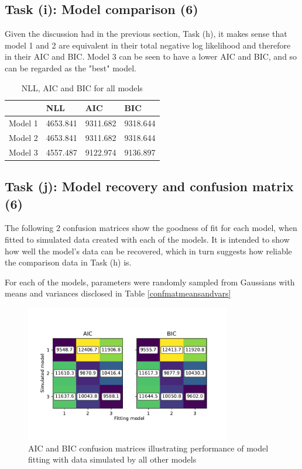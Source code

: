 \documentclass{article}
\begin{document}
\subsection{Task (i): Model comparison (6)}

Given the discussion had in the previous section, Task (h), it makes sense that model 1 and 2 are equivalent in their total negative log likelihood and therefore in their AIC and BIC. Model 3 can be seen to have a lower AIC and BIC, and so can be regarded as the "best" model.
\begin{table}[H]
  \centering
  \begin{tabular}{@{}llll@{}}
  \toprule
          & NLL      & AIC      & BIC      \\ \midrule
  Model 1 & 4653.841 & 9311.682 & 9318.644 \\
  Model 2 & 4653.841 & 9311.682 & 9318.644 \\
  Model 3 & 4557.487 & 9122.974 & 9136.897 \\ \bottomrule
  \end{tabular}
  \caption{NLL, AIC and BIC for all models}
  \label{table:aicbic}
\end{table}

\subsection{Task (j): Model recovery and confusion matrix (6)}

The following 2 confusion matrices show the goodness of fit for each model, when fitted to simulated data created with each of the models. It is intended to show how well the model's data can be recovered, which in turn suggests how reliable the comparison data in Task (h) is.

For each of the models, parameters were randomly sampled from Gaussians with means and variances disclosed in Table \ref{confmatmeansandvars}

\begin{figure}[H]
  \centering
  \includegraphics[width=0.8\textwidth]{figures/part2/task10/confusion_matrix.pdf}
  \caption{AIC and BIC confusion matrices illustrating performance of model fitting with data simulated by all other models}
  \label{fig:confusionmatrix}
\end{figure}
\end{document}
